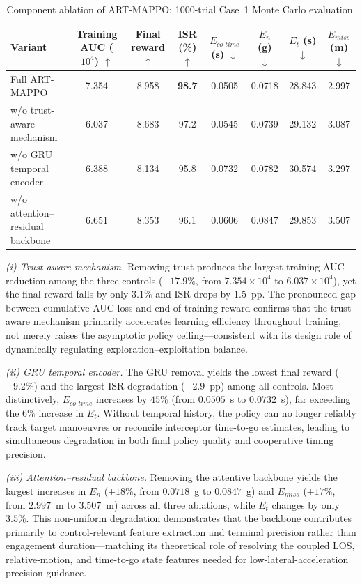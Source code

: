 \documentclass[lettersize,journal]{IEEEtran}
\begin{document}
\begin{table}[!t]
\centering

\small
\caption{Component ablation of ART-MAPPO: 1000-trial Case~1 Monte Carlo evaluation.}
\label{tab:ablation_case1}
\renewcommand{\arraystretch}{1.12}
\setlength{\tabcolsep}{3.5pt}
\begin{tabular}{lccccccc}
\toprule
Variant
  & Training AUC ($10^4$) $\uparrow$
  & Final reward $\uparrow$
  & ISR (\%) $\uparrow$
  & $E_{co\text{-}time}$ (s) $\downarrow$
  & $E_n$ (g) $\downarrow$
  & $E_t$ (s) $\downarrow$
  & $E_{miss}$ (m) $\downarrow$ \\
\midrule
Full ART-MAPPO                   & 7.354 & 8.958 & \textbf{98.7} & 0.0505 & 0.0718 & 28.843 & 2.997 \\
w/o trust-aware mechanism        & 6.037 & 8.683 & 97.2          & 0.0545 & 0.0739 & 29.132 & 3.087 \\
w/o GRU temporal encoder         & 6.388 & 8.134 & 95.8          & 0.0732 & 0.0782 & 30.574 & 3.297 \\
w/o attention--residual backbone & 6.651 & 8.353 & 96.1          & 0.0606 & 0.0847 & 29.853 & 3.507 \\
\bottomrule
\end{tabular}
\end{table}

\emph{(i) Trust-aware mechanism.}  Removing trust produces the largest training-AUC
reduction among the three controls ($-17.9\%$, from $7.354\!\times\!10^4$ to
$6.037\!\times\!10^4$), yet the final reward falls by only $3.1\%$ and ISR drops by
$1.5$~pp.  The pronounced gap between cumulative-AUC loss and end-of-training reward confirms
that the trust-aware mechanism primarily accelerates learning efficiency throughout training,
not merely raises the asymptotic policy ceiling---consistent with its design role of
dynamically regulating exploration--exploitation balance.

\emph{(ii) GRU temporal encoder.}  The GRU removal yields the lowest final reward
($-9.2\%$) and the largest ISR degradation ($-2.9$~pp) among all controls.  Most
distinctively, $E_{co\text{-}time}$ increases by $45\%$ (from $0.0505$~s to $0.0732$~s),
far exceeding the $6\%$ increase in $E_t$.  Without temporal history, the policy can no
longer reliably track target manoeuvres or reconcile interceptor time-to-go estimates,
leading to simultaneous degradation in both final policy quality and cooperative timing
precision.

\emph{(iii) Attention--residual backbone.}  Removing the attentive backbone yields the
largest increases in $E_n$ ($+18\%$, from $0.0718$~g to $0.0847$~g) and $E_{miss}$
($+17\%$, from $2.997$~m to $3.507$~m) across all three ablations, while $E_t$ changes by
only $3.5\%$.  This non-uniform degradation demonstrates that the backbone contributes
primarily to control-relevant feature extraction and terminal precision rather than
engagement duration---matching its theoretical role of resolving the coupled LOS,
relative-motion, and time-to-go state features needed for low-lateral-acceleration precision guidance.
\end{document}
